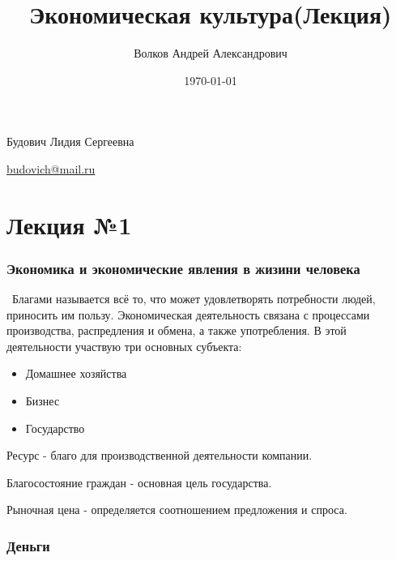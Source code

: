 \documentclass[a4paper, 12pt]{article}
\author{Волков Андрей Александрович}
\title{Экономическая культура(Лекция)}
\date{\today}
\begin{document}
	\maketitle
	Будович Лидия Сергеевна
	
	\href{budovich@mail.ru}{budovich@mail.ru}
	
	\part{Лекция №1}
	
	\section{Экономика и экономические явления в жизини человека}
	
	\quad \, Благами называется всё то, что может удовлетворять потребности людей, приносить им пользу. Экономическая деятельность связана с процессами производства, распредления и обмена, а также употребления. В этой деятельности участвую три основных субъекта:
	\begin{itemize}
		\item Домашнее хозяйства
		\item Бизнес
		\item Государство
	\end{itemize}

	Ресурс - благо для производственной деятельности компании.
	
	Благосостояние граждан - основная цель государства.
	
	Рыночная цена - определяется соотношением предложения и спроса.

	\section{Деньги}
	
	\section{}
	
	\section{}
	
\end{document}
